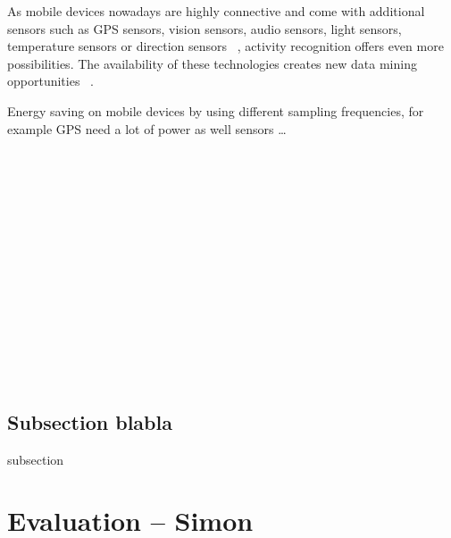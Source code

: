 \documentclass[conference]{IEEEtran}
\begin{document}
As mobile devices nowadays are highly connective and come with additional sensors such as \ac{GPS} sensors, vision sensors, audio sensors, light sensors, temperature sensors or direction sensors ~\cite{Kwapisz2011}, activity recognition offers even more possibilities. The availability of these technologies creates new data mining opportunities ~\cite{Kwapisz2011}.

Energy saving on mobile devices by using different sampling frequencies, for example \ac{GPS} need a lot of power as well sensors \dots
\\
\\
\\
\\
\\
\\
\\
\\
\\
\\
\\
\\
\\
\\
\\
\subsection{Subsection blabla}
subsection
\newpage
\section{Evaluation -- Simon}
\end{document}
